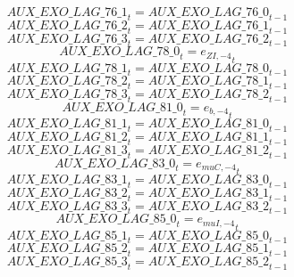 \begin{dmath}
{AUX\_EXO\_LAG\_76\_1}_{t}={AUX\_EXO\_LAG\_76\_0}_{t-1}
\end{dmath}
\begin{dmath}
{AUX\_EXO\_LAG\_76\_2}_{t}={AUX\_EXO\_LAG\_76\_1}_{t-1}
\end{dmath}
\begin{dmath}
{AUX\_EXO\_LAG\_76\_3}_{t}={AUX\_EXO\_LAG\_76\_2}_{t-1}
\end{dmath}
\begin{dmath}
{AUX\_EXO\_LAG\_78\_0}_{t}={{e_{ZI,-4}}}_{t}
\end{dmath}
\begin{dmath}
{AUX\_EXO\_LAG\_78\_1}_{t}={AUX\_EXO\_LAG\_78\_0}_{t-1}
\end{dmath}
\begin{dmath}
{AUX\_EXO\_LAG\_78\_2}_{t}={AUX\_EXO\_LAG\_78\_1}_{t-1}
\end{dmath}
\begin{dmath}
{AUX\_EXO\_LAG\_78\_3}_{t}={AUX\_EXO\_LAG\_78\_2}_{t-1}
\end{dmath}
\begin{dmath}
{AUX\_EXO\_LAG\_81\_0}_{t}={{e_{b,-4}}}_{t}
\end{dmath}
\begin{dmath}
{AUX\_EXO\_LAG\_81\_1}_{t}={AUX\_EXO\_LAG\_81\_0}_{t-1}
\end{dmath}
\begin{dmath}
{AUX\_EXO\_LAG\_81\_2}_{t}={AUX\_EXO\_LAG\_81\_1}_{t-1}
\end{dmath}
\begin{dmath}
{AUX\_EXO\_LAG\_81\_3}_{t}={AUX\_EXO\_LAG\_81\_2}_{t-1}
\end{dmath}
\begin{dmath}
{AUX\_EXO\_LAG\_83\_0}_{t}={{e_{muC,-4}}}_{t}
\end{dmath}
\begin{dmath}
{AUX\_EXO\_LAG\_83\_1}_{t}={AUX\_EXO\_LAG\_83\_0}_{t-1}
\end{dmath}
\begin{dmath}
{AUX\_EXO\_LAG\_83\_2}_{t}={AUX\_EXO\_LAG\_83\_1}_{t-1}
\end{dmath}
\begin{dmath}
{AUX\_EXO\_LAG\_83\_3}_{t}={AUX\_EXO\_LAG\_83\_2}_{t-1}
\end{dmath}
\begin{dmath}
{AUX\_EXO\_LAG\_85\_0}_{t}={{e_{muI,-4}}}_{t}
\end{dmath}
\begin{dmath}
{AUX\_EXO\_LAG\_85\_1}_{t}={AUX\_EXO\_LAG\_85\_0}_{t-1}
\end{dmath}
\begin{dmath}
{AUX\_EXO\_LAG\_85\_2}_{t}={AUX\_EXO\_LAG\_85\_1}_{t-1}
\end{dmath}
\begin{dmath}
{AUX\_EXO\_LAG\_85\_3}_{t}={AUX\_EXO\_LAG\_85\_2}_{t-1}
\end{dmath}
